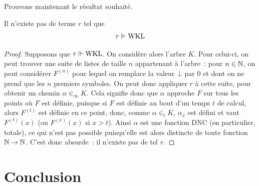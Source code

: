 \documentclass{article}
\begin{document}
Prouvons maintenant le résultat souhaité.

\begin{them}
    Il n'existe pas de terme $r$ tel que
    \[r\Vdash \mathrm{WKL}\]
\end{them}

\begin{proof}
    Supposons que $r \Vdash \mathrm{WKL}$. On considère alors l'arbre $K$. Pour celui-ci, on peut trouver une suite de listes de taille $n$ appartenant à l'arbre~: pour $n\in \mathbb{N}$, on peut considérer $F^{(n)}$ pour lequel on remplace la valeur $\bot$ par $0$ et dont on ne prend que les $n$ premiers symboles. On peut donc appliquer $r$ à cette suite, pour obtenir un chemin $\alpha \in_\infty K$. Cela signifie donc que $\alpha$ approche $F$ sur tous les points où $F$ est définie, puisque si $F$ est définie au bout d'un temps $t$ de calcul, alors $F^{(t)}$ est définie en ce point, donc, comme $\alpha \in_t K$, $\alpha_x$ est défini et vaut $F^{(t)}(x)$ (ou $F^{(x)}(x)$ si $x > t$). Ainsi $\alpha$ est une fonction DNC (en particulier, totale), ce qui n'est pas possible puisqu'elle est alors distincte de toute fonction $\mathbb{N} \to \mathbb{N}$. C'est donc absurde~: il n'existe pas de tel $r$.
\end{proof}

\section{Conclusion}
\end{document}
